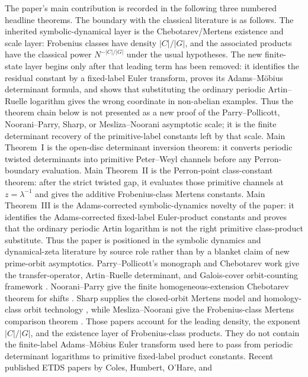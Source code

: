 \documentclass[11pt,a4paper]{amsart}
\theoremstyle{plain}
\theoremstyle{definition}
\theoremstyle{remark}
\begin{document}
The paper's main contribution is recorded in the following three numbered
headline theorems.  The boundary with the classical literature is as follows.
The inherited symbolic-dynamical layer is the Chebotarev/Mertens existence and
scale layer: Frobenius classes have density 
\(|C|/|G|\), and the associated products have the classical power
\(N^{-|C|/|G|}\) under the usual hypotheses.  The new finite-state layer begins
only after that leading term has been removed: it identifies the residual
constant by a fixed-label Euler transform, proves its Adams--M\"obius
determinant formula, and shows that substituting the ordinary periodic
Artin--Ruelle logarithm gives the wrong coordinate in non-abelian examples.
Thus the theorem chain below is not presented as a new proof of the
Parry--Pollicott, Noorani--Parry, Sharp, or Mesliza--Noorani asymptotic scale;
it is the finite determinant recovery of the primitive-label constants left by
that scale.  Main Theorem~I is the open-disc determinant
inversion theorem: it converts periodic twisted determinants into primitive
Peter--Weyl channels before any Perron-boundary evaluation.  Main
Theorem~II is the Perron-point class-constant theorem: after the strict
twisted gap, it evaluates those primitive channels at
\(z=\lambda^{-1}\) and gives the additive Frobenius-class Mertens constants.
Main Theorem~III is the Adams-corrected symbolic-dynamics novelty of the paper:
it identifies the Adams-corrected fixed-label Euler-product constants and
proves that the ordinary periodic Artin logarithm is not the right primitive
class-product substitute.  Thus the paper is positioned in the symbolic
dynamics and dynamical-zeta literature by source role rather than by a blanket
claim of new prime-orbit asymptotics.  Parry--Pollicott's monograph and
Chebotarev work give the transfer-operator, Artin--Ruelle determinant, and
Galois-cover orbit-counting framework
\cite{ParryPollicott1990Zeta,ParryPollicott1986Chebotarev}.  Noorani--Parry
give the finite homogeneous-extension Chebotarev theorem for shifts
\cite{NooraniParry1992ChebotarevShifts}.  Sharp supplies the closed-orbit
Mertens model and homology-class orbit technology
\cite{Sharp1991Mertens,Sharp1993ClosedOrbitsHomologyAnosov}, while
Mesliza--Noorani give the Frobenius-class Mertens comparison theorem
\cite{MeslizaNoorani1999FrobeniusMertens}.  Those papers account for the
leading density, the exponent \(|C|/|G|\), and the existence layer of
Frobenius-class products.  They do not contain the finite-label
Adams--M\"obius Euler transform used here to pass from periodic determinant
logarithms to primitive fixed-label product constants.  Recent published ETDS papers by Coles, Humbert, O'Hare, and
\end{document}
